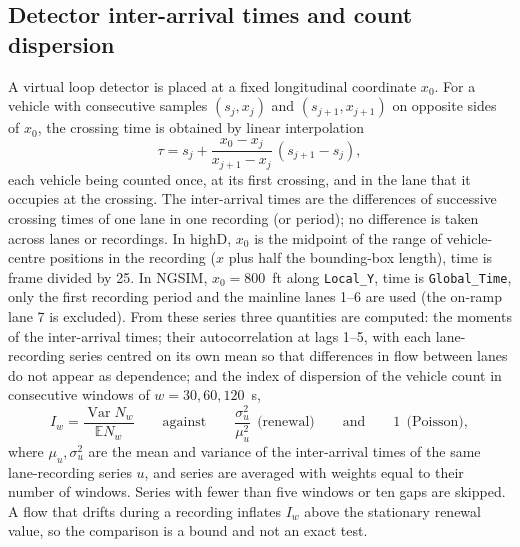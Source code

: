 \documentclass[11pt,a4paper]{article}
\numberwithin{equation}{section}
\newcommand{\E}{\mathbb{E}}
\newcommand{\Var}{\operatorname{Var}}
\begin{document}
\subsection{Detector inter-arrival times and count dispersion}\label{sec:detmethod}
A virtual loop detector is placed at a fixed longitudinal coordinate $x_0$. For a vehicle with consecutive samples $(s_j,x_j)$ and $(s_{j+1},x_{j+1})$ on opposite sides of $x_0$, the crossing time is obtained by linear interpolation
\begin{equation}\label{eq:crossing}
\tau=s_j+\frac{x_0-x_j}{x_{j+1}-x_j}\,(s_{j+1}-s_j),
\end{equation}
each vehicle being counted once, at its first crossing, and in the lane that it occupies at the crossing. The inter-arrival times are the differences of successive crossing times of one lane in one recording (or period); no difference is taken across lanes or recordings.
In highD, $x_0$ is the midpoint of the range of vehicle-centre positions in the recording ($x$ plus half the bounding-box length), time is frame divided by 25. In NGSIM, $x_0=800$~ft along \texttt{Local\_Y}, time is \texttt{Global\_Time}, only the first recording period and
the mainline lanes 1--6 are used (the on-ramp lane 7 is excluded). From these series three quantities are computed: the moments of the inter-arrival times; their autocorrelation at lags 1--5, with each lane-recording series centred on its own mean so that
differences in flow between lanes do not appear as dependence; and the index of dispersion of the vehicle count in consecutive windows of $w=30,60,120$~s,
\begin{equation}\label{eq:window}
I_w=\frac{\Var N_w}{\E N_w}\qquad\text{against}\qquad \frac{\sigma_u^2}{\mu_u^2}\ \ \text{(renewal)}\qquad\text{and}\qquad 1\ \ \text{(Poisson)},
\end{equation}
where $\mu_u,\sigma_u^2$ are the mean and variance of the inter-arrival times of the same lane-recording series $u$, and series are averaged with weights equal to their number of windows. Series with fewer than five windows or ten gaps are skipped. A flow that drifts during a recording
inflates $I_w$ above the stationary renewal value, so the comparison is a bound and not an exact test.
\end{document}
